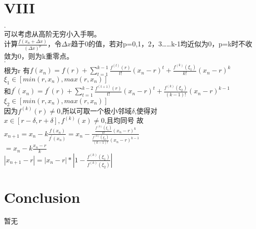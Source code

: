 \documentclass{article}
\begin{document}
\section*{VIII}
\begin{flushleft}
\textbf{$\cdot$\\}  
  可以考虑从高阶无穷小入手啊。\\
  计算$\frac{f(x_n+\Delta x)}{(\Delta x)^p}$，令$\Delta x$趋于0的值，若对p=0,1，2，3……k-1均近似为0，p=k时不收敛为0，则为k重零点。\\

\textbf{$\cdot$\\}  
  根为r
  有$f(x_n)=f(r)+\sum_{t=1}^{k-1}\frac{f^{(t)}(r)}{t!}(x_n-r)^t+\frac{f^{(k)}(\xi_1)}{k!}(x_n-r)^k$\\
  $\xi_1 \in [min(r,x_n),max(r,x_n)]$\\
  和$f^{'}(x_n)=f^{'}(r)+\sum_{t=1}^{k-2}\frac{f^{(t+1)}(r)}{t!}(x_n-r)^t+\frac{f^{(k)}(\xi_2)}{(k-1)!}(x_n-r)^{k-1}$
  $\xi_2 \in [min(r,x_n),max(r,x_n)]$\\
  因为$f^{(k)}(r) \neq 0$,所以可取一个极小邻域$\delta$,使得对$x \in [r-\delta,r+\delta], f^{(k)}(x) \neq 0$,且均同号
  故$x_{n+1}=x_n-k\frac{f(x_n)}{f^{'}(x_n)}=x_n-\frac{\frac{f^{(k)}(\xi_1)}{k!}(x_n-r)^k}{\frac{f^{(k)}(\xi_2)}{(k-1)!}(x_n-r)^{k-1}}$\\
  $=x_n-k\frac{x_n-r}{k}$\\
  $|x_{n+1}-r|=|x_n-r|*|1-\frac{f^{(k)}(\xi_1)}{f^{(k)}(\xi_2)}|$\\
  
\end{flushleft}



\section*{Conclusion}
暂无
\end{document}
